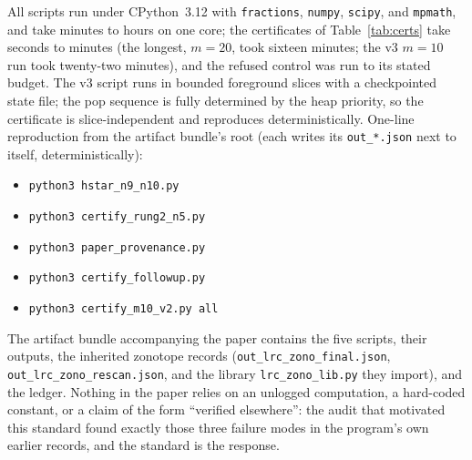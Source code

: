 All scripts run under CPython~3.12 with \texttt{fractions},
\texttt{numpy}, \texttt{scipy}, and \texttt{mpmath}, and take minutes
to hours on one core; the certificates of Table~\ref{tab:certs} take
seconds to minutes (the longest, $m=20$, took sixteen minutes; the v3
$m=10$ run took twenty-two minutes), and the
refused control was run to its stated budget. The v3 script runs in
bounded foreground slices with a checkpointed state file; the pop
sequence is fully determined by the heap priority, so the certificate
is slice-independent and reproduces deterministically. One-line
reproduction from the artifact bundle's root (each
writes its \texttt{out\_*.json} next to itself, deterministically):
\begin{itemize}[leftmargin=2.2em,itemsep=1pt,topsep=2pt]
\item \texttt{python3 hstar\_n9\_n10.py}
\item \texttt{python3 certify\_rung2\_n5.py}
\item \texttt{python3 paper\_provenance.py}
\item \texttt{python3 certify\_followup.py}
\item \texttt{python3 certify\_m10\_v2.py all}
\end{itemize} The artifact
bundle accompanying the paper contains the five scripts, their outputs,
the inherited zonotope records
(\texttt{out\_lrc\_zono\_final.json},
\texttt{out\_lrc\_zono\_rescan.json}, and the library
\texttt{lrc\_zono\_lib.py} they import), and the ledger. Nothing in the
paper relies on an unlogged computation, a hard-coded constant, or a
claim of the form ``verified elsewhere'': the audit that motivated this
standard found exactly those three failure modes in the program's own
earlier records, and the standard is the response.
